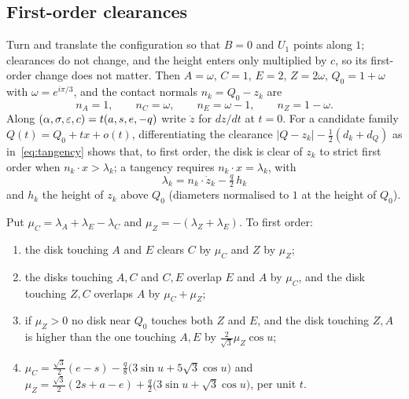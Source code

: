 \subsection{First-order clearances}
Turn and translate the configuration so that $B=0$ and $U_1$ points along $1$; clearances do not change,
and the height enters only multiplied by $c$, so its first-order change does not matter. Then
$A=\omega$, $C=1$, $E=2$, $Z=2\omega$, $Q_0=1+\omega$ with $\omega=e^{i\pi/3}$, and the contact normals
$n_k=Q_0-z_k$ are
\[
n_A=1,\qquad n_C=\omega,\qquad n_E=\omega-1,\qquad n_Z=1-\omega.
\]
Along $(\alpha,\sigma,\varepsilon,c)=t(a,s,e,-q)$ write $\dot z$ for $dz/dt$ at $t=0$. For a candidate family $Q(t)=Q_0+t x+o(t)$, differentiating the clearance $|Q-z_k|-\tfrac12(d_k+d_Q)$ as in~\eqref{eq:tangency} shows that, to
first order, the disk is clear of $z_k$ to strict first order when $n_k\cdot x>\lambda_k$; a tangency requires $n_k\cdot x=\lambda_k$, with
\[
\lambda_k=n_k\cdot\dot z_k-\tfrac q2\,h_k
\]
and $h_k$ the height of $z_k$ above $Q_0$ (diameters normalised to $1$ at the height of $Q_0$).

\begin{lemma}\label{lem:hexclear}
Put $\mu_C=\lambda_A+\lambda_E-\lambda_C$ and $\mu_Z=-(\lambda_Z+\lambda_E)$. To first order:
\begin{enumerate}
\item[(a)] the disk touching $A$ and $E$ clears $C$ by $\mu_C$ and $Z$ by $\mu_Z$;
\item[(b)] the disks touching $A,C$ and $C,E$ overlap $E$ and $A$ by $\mu_C$, and the disk touching $Z,C$
overlaps $A$ by $\mu_C+\mu_Z$;
\item[(c)] if $\mu_Z>0$ no disk near $Q_0$ touches both $Z$ and $E$, and the disk touching $Z,A$ is higher than the one
touching $A,E$ by $\tfrac2{\sqrt3}\mu_Z\cos u$;
\item[(d)] $\mu_C=\tfrac{\sqrt3}2(e-s)-\tfrac q8\bigl(3\sin u+5\sqrt3\cos u\bigr)$ and
$\mu_Z=\tfrac{\sqrt3}2(2s+a-e)+\tfrac q2\bigl(3\sin u+\sqrt3\cos u\bigr)$, per unit $t$.
\end{enumerate}
\end{lemma}

